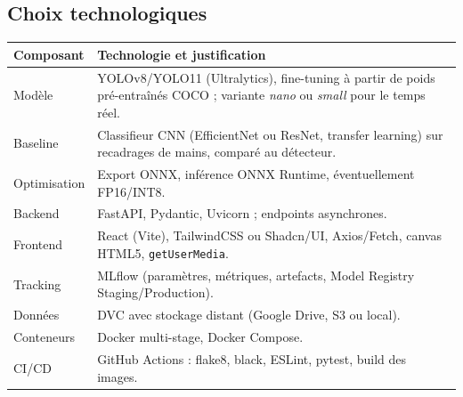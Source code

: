\documentclass[11pt,a4paper]{article}
\begin{document}
\begin{center}
\end{center}

\subsection{Choix technologiques}

\begin{center}
\begin{tabular}{@{}p{4cm}p{9cm}@{}}
\toprule
\textbf{Composant} & \textbf{Technologie et justification} \\ \midrule
Modèle & YOLOv8/YOLO11 (Ultralytics), fine-tuning à partir de poids pré-entraînés COCO ; variante \textit{nano} ou \textit{small} pour le temps réel. \\
Baseline & Classifieur CNN (EfficientNet ou ResNet, transfer learning) sur recadrages de mains, comparé au détecteur. \\
Optimisation & Export ONNX, inférence ONNX Runtime, éventuellement FP16/INT8. \\
Backend & FastAPI, Pydantic, Uvicorn ; endpoints asynchrones. \\
Frontend & React (Vite), TailwindCSS ou Shadcn/UI, Axios/Fetch, canvas HTML5, \texttt{getUserMedia}. \\
Tracking & MLflow (paramètres, métriques, artefacts, Model Registry Staging/Production). \\
Données & DVC avec stockage distant (Google Drive, S3 ou local). \\
Conteneurs & Docker multi-stage, Docker Compose. \\
CI/CD & GitHub Actions : flake8, black, ESLint, pytest, build des images. \\ \bottomrule
\end{tabular}
\end{center}
\end{document}
